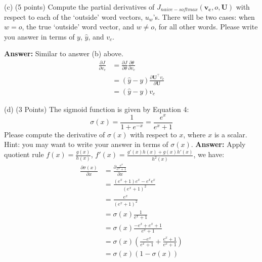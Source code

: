 \documentclass{article}
\begin{document}
\smallbreak

\bigbreak

\noindent(c)  (5 points) Compute the partial derivatives of $J_{naive-softmax}(\mathbf{v_c},o,\mathbf{U})$ with respect to each of the ‘outside’ word vectors, $u_w$’s.  There will be two cases:  when $w=o$, the true ‘outside’ word vector, and $w\ne{o}$, for all other words.  Please write you answer in terms of $y$, $\hat{y}$, and $v_c$.
\bigbreak

\textbf{Answer:} Similar to answer (b) above.
\begin{align*}
    \frac{\partial J}{\partial v_c} &= \frac{\partial J}{\partial \theta} \frac{\partial \theta}{\partial v_c}\\
    &= (\hat{y} - y) \frac{\partial \mathbf{U^\intercal}v_c}{\partial \mathbf{U}} \\
    &= (\hat{y} - y) v_c
\end{align*}
\bigbreak


\noindent(d)  (3 Points) The sigmoid function is given by Equation 4:
\begin{equation} \label{eq4}
\sigma(x) = \frac{1}{1+e^{-x}} =  \frac{e^{x}}{e^{x} + 1}
\end{equation}
Please compute the derivative of $\sigma(x)$ with respect to $x$, where $x$ is a scalar.  Hint:  you may want to write your answer in terms of $\sigma(x)$.
\bigbreak
\textbf{Answer:} Apply quotient rule $f(x) = \frac{g(x)}{h(x)}$, $f\prime(x) = \frac{g\prime(x)h(x) + g(x)h\prime(x)}{h^2(x)}$, we have:
\begin{align*}
\frac{\partial \sigma(x)}{\partial x} &= \frac{\partial \frac{e^x}{e^x+1}}{\partial x}\\
&=\frac{(e^x+1)e^x - e^x e^x}{(e^x+1)^2}\\
&=\frac{e^x}{(e^x + 1)^2}\\
&=\sigma(x) \frac{1}{e^x+1}\\
&=\sigma(x) \frac{-e^x + e^x + 1}{e^x+1}\\
&=\sigma(x) (\frac{-e^x}{e^x+1} + \frac{e^x + 1}{e^x+1} )\\
&=\sigma(x) (1 - \sigma(x))
\end{align*}
\bigbreak
\end{document}
